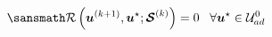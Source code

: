\documentclass[preview]{standalone}
\begin{document}
$ \displaystyle \sansmath
  \mathcal{R}\left( \boldsymbol{u}^{(k+1)}, \boldsymbol{u}^{\star} ; \boldsymbol{\mathcal{S}}^{(k)} \right) = 0 \;\;\; \forall \boldsymbol{u}^{\star} \in \mathcal{U}_{ad}^{0}
$
\end{document}
